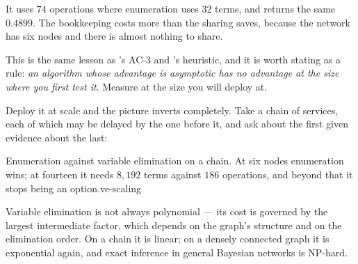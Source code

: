\begin{alertbox}
It uses $74$ operations where enumeration uses $32$ terms, and returns the same
$0.4899$. The bookkeeping costs more than the sharing saves, because the network has
six nodes and there is almost nothing to share.

This is the same lesson as 's AC-3 and 's heuristic, and
it is worth stating as a rule: \emph{an algorithm whose advantage is asymptotic has
no advantage at the size where you first test it}. Measure at the size you will
deploy at.
\end{alertbox}

Deploy it at scale and the picture inverts completely. Take a chain of services,
each of which may be delayed by the one before it, and ask about the first given
evidence about the last:

%
{Enumeration against variable elimination on a chain. At six nodes enumeration
wins; at fourteen it needs $8{,}192$ terms against $186$ operations, and beyond
that it stops being an option.}{ve-scaling}

Variable elimination is not always polynomial --- its cost is governed by the
largest intermediate factor, which depends on the graph's structure and on the
elimination order. On a chain it is linear; on a densely connected graph it is
exponential again, and exact inference in general Bayesian networks is NP-hard.

